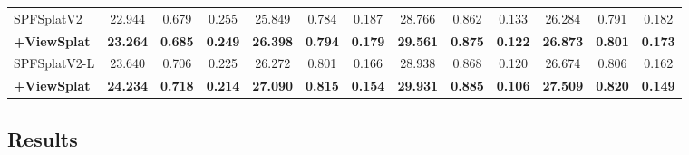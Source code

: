 \documentclass[runningheads]{llncs}
\begin{document}
\begin{table}
{\begin{tabular}{l ccc ccc ccc ccc}
            SPFSplatV2 & 22.944 & 0.679 & 0.255 & 25.849 & 0.784 & 0.187 & 28.766 & 0.862 & 0.133 & 26.284 & 0.791 & 0.182 \\
            \textbf{+ViewSplat} & \textbf{23.264} & \textbf{0.685} & \textbf{0.249} & \textbf{26.398} & \textbf{0.794} & \textbf{0.179} & \textbf{29.561} & \textbf{0.875} & \textbf{0.122} & \textbf{26.873} & \textbf{0.801} & \textbf{0.173} \\ \midrule
            SPFSplatV2-L & 23.640 & 0.706 & 0.225 & 26.272 & 0.801 & 0.166 & 28.938 & 0.868 & 0.120 & 26.674 & 0.806 & 0.162 \\
            \textbf{+ViewSplat} & \textbf{24.234} & \textbf{0.718} & \textbf{0.214} & \textbf{27.090} & \textbf{0.815} & \textbf{0.154} & \textbf{29.931} & \textbf{0.885} & \textbf{0.106} & \textbf{27.509} & \textbf{0.820} & \textbf{0.149} \\ \bottomrule
    \end{tabular}
    }
\vspace{-15pt}
\end{table}

\vspace{-0.4cm}
\subsection{Results}
\vspace{-0.2cm}
\end{document}

